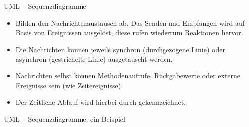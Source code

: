 \begin{frame}{UML -- Sequenzdiagramme}
    \hypertarget<1>{uml:sequence}{}\begin{itemize}[<+(1)->]\widei
        \item Bilden den Nachrichtenaustausch ab.\pause{} Das Senden und Empfangen wird auf Basis von Ereignissen ausgelöst,\pause{} diese rufen wiederrum Reaktionen hervor.
        \item Die Nachrichten können jeweils synchron (durchgezogene Linie) oder asynchron (gestrichelte Linie) ausgetauscht werden.
        \item Nachrichten selbst können Methodenaufrufe, Rückgabewerte oder externe Ereignisse sein (wie Zeitereignisse).
        \item Der Zeitliche Ablauf wird hierbei durch  gekennzeichnet.
    \end{itemize}
\end{frame}

\begin{frame}[c]{UML -- Sequenzdiagramme, ein Beispiel}
    \begin{center}
    \end{center}
\end{frame}

